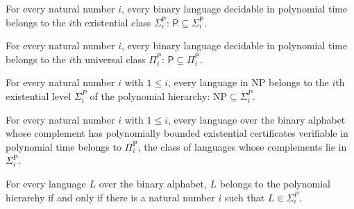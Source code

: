 \begin{theorem}
\label{Complexity.P_subset_SigmaP}
\leanok
{}
For every natural number $i$, every binary language decidable in polynomial time belongs
to the $i$th existential class $\Sigma_i^{\mathsf{P}}$: $\mathsf{P} \subseteq
\Sigma_i^{\mathsf{P}}$.
\end{theorem}

\begin{theorem}
\label{Complexity.P_subset_PiP}
\leanok
{}
For every natural number $i$, every binary language decidable in polynomial time belongs
to the $i$th universal class $\Pi_i^{\mathsf{P}}$: $\mathsf{P} \subseteq
\Pi_i^{\mathsf{P}}$.
\end{theorem}

\begin{theorem}
\label{Complexity.NP_subset_SigmaP}
\leanok
{}
For every natural number $i$ with $1\le i$, every language in $\mathrm{NP}$ belongs to
the $i$th existential level $\Sigma_i^P$ of the polynomial hierarchy:
$\mathrm{NP}\subseteq\Sigma_i^P$.
\end{theorem}

\begin{theorem}
\label{Complexity.coNP_subset_PiP}
\leanok
{}
For every natural number $i$ with $1 \le i$, every language over the binary alphabet
whose complement has polynomially bounded existential certificates verifiable in
polynomial time belongs to $\Pi_i^{\mathrm P}$, the class of languages whose complements
lie in $\Sigma_i^{\mathrm P}$.
\end{theorem}

\begin{theorem}
\label{Complexity.mem_PH_iff}
\leanok
{}
For every language $L$ over the binary alphabet, $L$ belongs to the polynomial hierarchy
if and only if there is a natural number $i$ such that $L\in\Sigma_i^P$.
\end{theorem}

